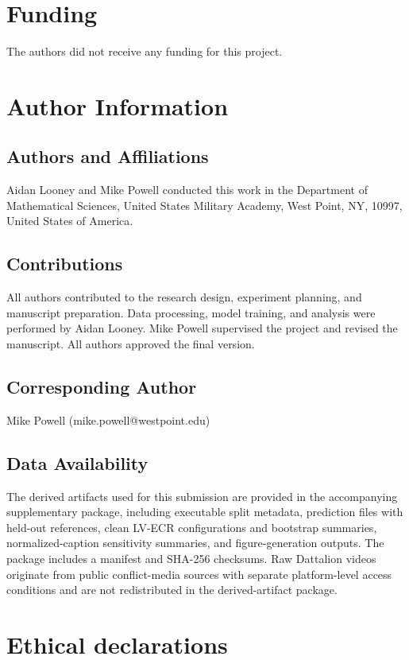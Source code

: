 \documentclass[pdflatex,sn-mathphys-num]{sn-jnl}
\theoremstyle{thmstyleone}
\theoremstyle{thmstyletwo}
\theoremstyle{thmstylethree}
\begin{document}
\section*{Funding}
The authors did not receive any funding for this project.

\section*{Author Information}
\subsection*{Authors and Affiliations}
Aidan Looney and Mike Powell conducted this work in the Department of Mathematical Sciences, United States Military Academy, West Point, NY, 10997, United States of America.

\subsection*{Contributions}
All authors contributed to the research design, experiment planning, and manuscript preparation. Data processing, model training, and analysis were performed by Aidan Looney. Mike Powell supervised the project and revised the manuscript. All authors approved the final version.

\subsection*{Corresponding Author}
Mike Powell (mike.powell@westpoint.edu)

\subsection*{Data Availability}
The derived artifacts used for this submission are provided in the accompanying supplementary package, including executable split metadata, prediction files with held-out references, clean LV-ECR configurations and bootstrap summaries, normalized-caption sensitivity summaries, and figure-generation outputs. The package includes a manifest and SHA-256 checksums. Raw Dattalion videos originate from public conflict-media sources with separate platform-level access conditions and are not redistributed in the derived-artifact package.

\section*{Ethical declarations}
\end{document}
